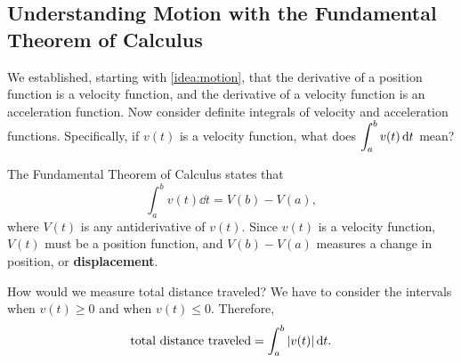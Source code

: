\subsection{Understanding Motion with the Fundamental Theorem of Calculus}

We established, starting with \autoref{idea:motion}, that the derivative of a position function is a velocity function, and the derivative of a velocity function is an acceleration function. Now consider definite integrals of velocity and acceleration functions. Specifically, if $v(t)$ is a velocity function, what does $\displaystyle \int_a^b v(t)\operatorname{d}\! t$ mean?

The Fundamental Theorem of Calculus states that
\[\int_a^b v(t)\dd t = V(b) - V(a),\]
where $V(t)$ is any antiderivative of $v(t)$. Since $v(t)$ is a velocity function, $V(t)$ must be a position function, and $V(b) - V(a)$ measures a change in position, or \textbf{displacement}.

How would we measure total distance traveled? We have to consider the intervals when $v(t)\geq 0$ and when $v(t)\leq 0$. Therefore,
\[\text{total distance traveled}=\int_a^b\left\lvert v(t) \right\rvert\operatorname{d}\! t.\]\bigskip

